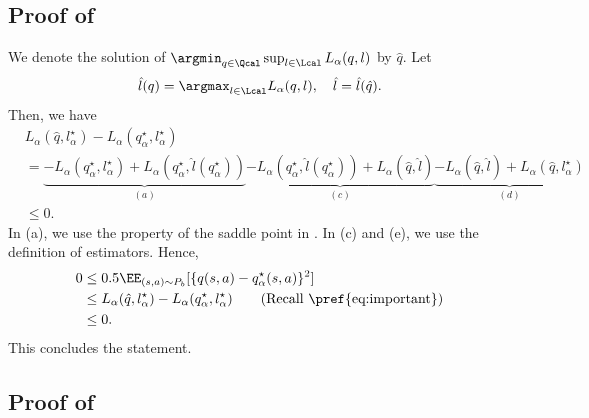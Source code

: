 \subsection{Proof of   }   

We denote the solution of $\argmin_{q \in \Qcal}\sup_{l \in \Lcal}L_{\alpha}(q,l)$ by $\hat q$. Let 
\begin{align*}
    \hat l(q) = \argmax_{l \in \Lcal}L_{\alpha}(q,l), \quad \hat l= \hat l(\hat q). 
\end{align*}
Then, we have 
\begin{align*}
    &L_{\alpha}(\hat q,l^{\star}_{\alpha})-L_{\alpha}( q^{\star}_{\alpha},l^{\star}_{\alpha})\\ 
    &=  \underbrace{-L_{\alpha}( q^{\star}_{\alpha},l^{\star}_{\alpha}) + L_{\alpha}(q^{\star}_{\alpha},\hat l(q^{\star}_{\alpha}))}_{(a)}\underbrace{-  L_{\alpha}(q^{\star}_{\alpha}, \hat l(q^{\star}_{\alpha})) +  L_{\alpha}(\hat q, \hat l)}_{(c)} \underbrace{- L_{\alpha}(\hat q, \hat l)+ L_{\alpha}(\hat q, l^{\star}_{\alpha})}_{(d)} \\
    &\leq 0. 
\end{align*}
In (a), we use the property of the saddle point in . In (c) and (e), we use the definition of estimators. Hence, 
\begin{align*}
   0&\leq 0.5 \EE_{(s,a) \sim P_b}[\{q(s,a)-q^{\star}_{\alpha}(s,a) \}^2]  \\ 
   &\leq L_{\alpha}(\hat q,l^{\star}_{\alpha})-L_{\alpha}( q^{\star}_{\alpha},l^{\star}_{\alpha}) \tag{Recall \pref{eq:important}} \\
   &\leq 0. 
\end{align*}
This concludes the statement. 

\subsection{Proof of  }

